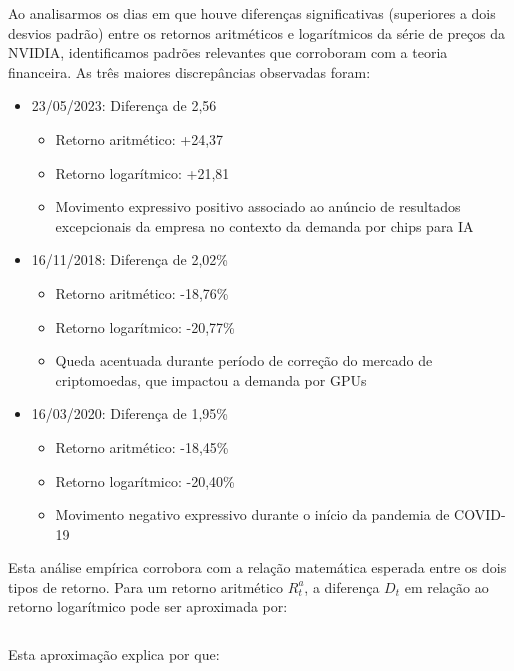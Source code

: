 \documentclass[a4paper, 12pt]{article}
\begin{document}
Ao analisarmos os dias em que houve diferenças significativas (superiores a dois desvios padrão) entre os retornos aritméticos e logarítmicos da série de preços da NVIDIA, identificamos padrões relevantes que corroboram com a teoria financeira. As três maiores discrepâncias observadas foram:
\begin{itemize}
\item 23/05/2023: Diferença de 2,56%
\begin{itemize}
\item Retorno aritmético: +24,37%
\item Retorno logarítmico: +21,81%
\item Movimento expressivo positivo associado ao anúncio de resultados excepcionais da empresa no contexto da demanda por chips para IA
\end{itemize}

\item 16/11/2018: Diferença de 2,02\%
    \begin{itemize}
        \item Retorno aritmético: -18,76\%
        \item Retorno logarítmico: -20,77\%
        \item Queda acentuada durante período de correção do mercado de criptomoedas, que impactou a demanda por GPUs
    \end{itemize}

\item 16/03/2020: Diferença de 1,95\%
    \begin{itemize}
        \item Retorno aritmético: -18,45\%
        \item Retorno logarítmico: -20,40\%
        \item Movimento negativo expressivo durante o início da pandemia de COVID-19
    \end{itemize}

\end{itemize}
Esta análise empírica corrobora com a relação matemática esperada entre os dois tipos de retorno. Para um retorno aritmético $R_t^a$, a diferença $D_t$ em relação ao retorno logarítmico pode ser aproximada por:

\begin{equation}
    [ D_t = R_t^a - R_t^l \approx \frac{(R_t^a)^2}{2} ]
\end{equation}

Esta aproximação explica por que:
\end{document}

